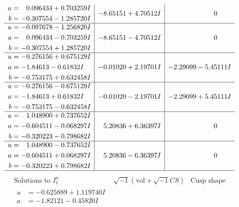 \documentclass[1p]{elsarticle_modified}
\theoremstyle{definition}
\newcommand{\I}{\sqrt{-1}}
\begin{document}
$$\begin{array}{c|c|c}
\begin{aligned}
a &= \phantom{-}0.096434 + 0.703259 I \\
b &= -0.307554 - 1.285720 I\end{aligned}
 & -8.65151 + 4.70512 I & \phantom{-0.000000 } 0 \\ \hline\begin{aligned}
u &= -0.097678 - 1.256820 I \\
a &= \phantom{-}0.096434 - 0.703259 I \\
b &= -0.307554 + 1.285720 I\end{aligned}
 & -8.65151 - 4.70512 I & \phantom{-0.000000 } 0 \\ \hline\begin{aligned}
u &= -0.276156 + 0.675129 I \\
a &= -1.84613 - 0.61832 I \\
b &= -0.753175 + 0.632458 I\end{aligned}
 & -0.01020 + 2.19701 I & -2.29099 - 5.45111 I \\ \hline\begin{aligned}
u &= -0.276156 - 0.675129 I \\
a &= -1.84613 + 0.61832 I \\
b &= -0.753175 - 0.632458 I\end{aligned}
 & -0.01020 - 2.19701 I & -2.29099 + 5.45111 I \\ \hline\begin{aligned}
u &= \phantom{-}1.048900 + 0.737652 I \\
a &= -0.604511 - 0.068297 I \\
b &= -0.320223 - 0.798682 I\end{aligned}
 & \phantom{-}5.20836 + 6.36397 I & \phantom{-0.000000 } 0 \\ \hline\begin{aligned}
u &= \phantom{-}1.048900 - 0.737652 I \\
a &= -0.604511 + 0.068297 I \\
b &= -0.320223 + 0.798682 I\end{aligned}
 & \phantom{-}5.20836 - 6.36397 I & \phantom{-0.000000 } 0\\
 \hline 
 \end{array}$$\newpage$$\begin{array}{c|c|c}  
\text{Solutions to }I^u_{1}& \I (\text{vol} + \sqrt{-1}CS) & \text{Cusp shape}\\
 \hline 
\begin{aligned}
u &= -0.625889 + 1.119740 I \\
a &= -1.82121 - 0.45820 I \\

\end{aligned}
\end{array}$$
\end{document}
